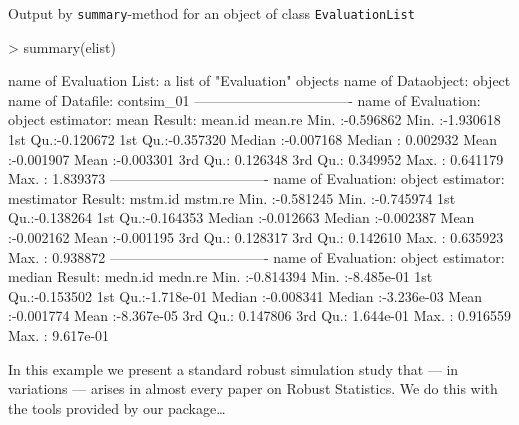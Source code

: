 \documentclass[11pt]{article}
\newcommand{\code}[1]{{\tt #1}}
\begin{document}
\begin{footnotesize}
Output by \code{summary}-method for an object of class \code{EvaluationList}
\begin{Schunk}
\begin{Sinput}
> summary(elist)
\end{Sinput}
\begin{Soutput}
name of Evaluation List: a list of "Evaluation" objects
name of Dataobject: object
name of Datafile: contsim_01
----------------------------------
name of Evaluation: object
estimator: mean
Result:
    mean.id             mean.re
 Min.   :-0.596862   Min.   :-1.930618
 1st Qu.:-0.120672   1st Qu.:-0.357320
 Median :-0.007168   Median : 0.002932
 Mean   :-0.001907   Mean   :-0.003301
 3rd Qu.: 0.126348   3rd Qu.: 0.349952
 Max.   : 0.641179   Max.   : 1.839373
----------------------------------
name of Evaluation: object
estimator: mestimator
Result:
    mstm.id             mstm.re
 Min.   :-0.581245   Min.   :-0.745974
 1st Qu.:-0.138264   1st Qu.:-0.164353
 Median :-0.012663   Median :-0.002387
 Mean   :-0.002162   Mean   :-0.001195
 3rd Qu.: 0.128317   3rd Qu.: 0.142610
 Max.   : 0.635923   Max.   : 0.938872
----------------------------------
name of Evaluation: object
estimator: median
Result:
    medn.id             medn.re
 Min.   :-0.814394   Min.   :-8.485e-01
 1st Qu.:-0.153502   1st Qu.:-1.718e-01
 Median :-0.008341   Median :-3.236e-03
 Mean   :-0.001774   Mean   :-8.367e-05
 3rd Qu.: 0.147806   3rd Qu.: 1.644e-01
 Max.   : 0.916559   Max.   : 9.617e-01
\end{Soutput}
\end{Schunk}
\end{footnotesize}
\begin{small}
In this example we present a standard robust simulation study that --- in variations --- arises in almost
every paper on Robust Statistics. We do this with the tools provided by our package\ldots
\end{small}
\end{document}
